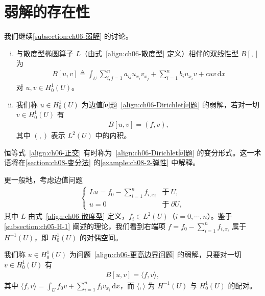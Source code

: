 \documentclass[../../main.tex]{subfiles}
\begin{document}
\section{弱解的存在性}\label{section:ch06-弱解存在性}

我们继续\cref{subsection:ch06-弱解} 的讨论。

\begin{definition}\label{definition:ch06-双线性型与弱解}
\leavevmode
\begin{enumerate}[(i)]
\item 与散度型椭圆算子 $L$（由式~\eqref{align:ch06-散度型} 定义）相伴的双线性型 $B[,]$ 为
\begin{align}
B[u,v]\triangleq\int_{U}\sum_{i,j=1}^{n}a_{ij}u_{x_{i}}v_{x_{j}}+\sum_{i=1}^{n}b_{i}u_{x_{i}}v+cuv\,\mathrm{d}x
\end{align}
对 $u,v\in H^{1}_{0}(U)$。
\item 我们称 $u\in H^{1}_{0}(U)$ 为边值问题~\eqref{align:ch06-Dirichlet问题} 的弱解，若对一切 $v\in H^{1}_{0}(U)$ 有
\begin{align}
B[u,v]=(f,v),
\end{align}
其中 $(,)$ 表示 $L^{2}(U)$ 中的内积。
\end{enumerate}
\end{definition}

恒等式~\eqref{align:ch06-正交} 有时称为~\eqref{align:ch06-Dirichlet问题} 的变分形式。这一术语将在\cref{section:ch08-变分法} 的\cref{example:ch08-2-弹性} 中解释。

更一般地，考虑边值问题
\begin{align}
\begin{cases}
Lu=f_{0}-\sum_{i=1}^{n}f_{i,x_{i}} & \text{于}\ U,\\
u=0 & \text{于}\ \partial U,
\end{cases}
\end{align}
其中 $L$ 由式~\eqref{align:ch06-散度型} 定义，$f_{i}\in L^{2}(U)$（$i=0,\cdots,n$）。鉴于\cref{subsection:ch05-H-1} 阐述的理论，我们看到右端项 $f=f_{0}-\sum_{i=1}^{n}f_{i,x_{i}}$ 属于 $H^{-1}(U)$，即 $H^{1}_{0}(U)$ 的对偶空间。

\begin{definition}\label{definition:ch06-H-1弱解}
我们称 $u\in H^{1}_{0}(U)$ 为问题~\eqref{align:ch06-更高边界问题} 的弱解，只要对一切 $v\in H^{1}_{0}(U)$ 有
\begin{align*}
B[u,v]=\langle f,v\rangle,
\end{align*}
其中 $\langle f,v\rangle=\int_{U}f_{0}v+\sum_{i=1}^{n}f_{i}v_{x_{i}}\,\mathrm{d}x$，而 $\langle,\rangle$ 为 $H^{-1}(U)$ 与 $H^{1}_{0}(U)$ 的配对。
\end{definition}
\end{document}
